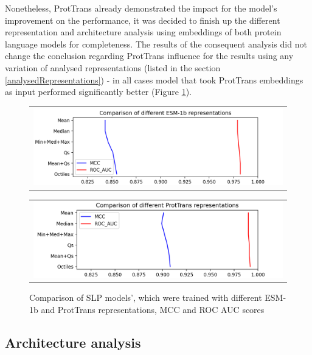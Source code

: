 \documentclass[12pt]{article}
\begin{document}
	Nonetheless, ProtTrans already demonstrated the impact for the 
	model's improvement on the performance, it was decided to finish up 
	the different representation and architecture analysis using embeddings
	of both protein language models for completeness. The results 
	of the consequent analysis 
	did not change the conclusion regarding ProtTrans influence for the 
	results using any variation of analysed representations (listed in the
	section \ref{analysedRepresentations}) - in all cases model that took 
	ProtTrans embeddings as input performed significantly better (Figure 
	\ref{figure:scoresRepresentationsESMandPT}).

	\begin{figure}[h!]
		\centering
		\begin{tabular}{@{}c@{}}
			\includegraphics[scale=0.7]{SLP_ESM_003_diff_representations.png}
		\end{tabular}

		\begin{tabular}{@{}c@{}}
			\includegraphics[scale=0.7]{SLP_PT_003_diff_representations.png}
		\end{tabular}
		
		\caption{Comparison of SLP models', which were trained with different
		ESM-1b and ProtTrans representations, MCC and ROC AUC scores}
		\label{figure:scoresRepresentationsESMandPT}
	\end{figure}

	\newpage

	\subsection{Architecture analysis}
\end{document}
